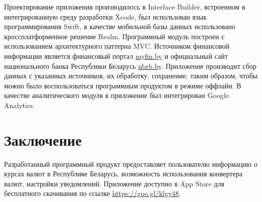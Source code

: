 \documentclass[a4paper,11pt,twoside]{article}
\begin{document}
\begin{multicols}{2}
Проектирование приложения производилось в Interface Builder, встроенном в
интегрированную среду разработки Xcode, был использован язык программирования Swift,
в качестве мобильной базы данных использовано кроссплатформенное решение Realm.
Программный модуль построен с использованием архитектурного паттерна MVC.
Источником финансовой информации является финансовый портал \url{myfin.by} и
официальный сайт национального банка Республики Беларусь \url{nbrb.by}.
Приложение производит сбор данных с указанных источников,
их обработку, сохранение, таким образом, чтобы можно было
воспользоваться программным продуктом в режиме оффлайн.
В качестве аналитического модуля в приложение был интегрирован Google Analytics.

\section*{Заключение}
Разработанный программный продукт предоставляет пользователю информацию о курсах
валют в Республике Беларусь, возможность использования конвертера валют,
настройки уведомлений. Приложение доступно в App Store для бесплатного скачивания по
ссылке \url{https://goo.gl/klgy48}.


\end{multicols}


\end{document}
